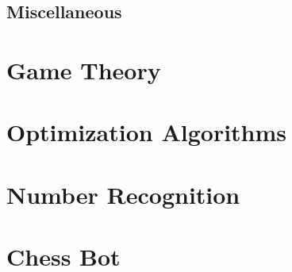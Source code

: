 \documentclass[10pt,a4paper]{report}
\begin{document}
	\section{Miscellaneous}

	\chapter{Game Theory}

	\chapter{Optimization Algorithms}

	\begin{appendices}

		\chapter{Number Recognition}

		\chapter{Chess Bot}

	\end{appendices}
\end{document}
